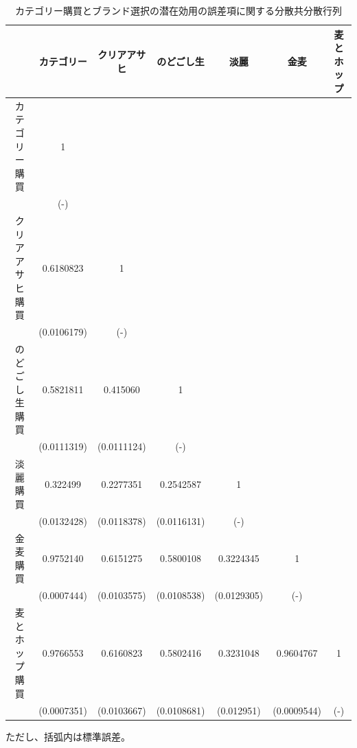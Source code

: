 \documentclass[11pt]{jsarticle}
\begin{document}
\begin{table}[htbp]
 \centering
  \caption{カテゴリー購買とブランド選択の潜在効用の誤差項に関する分散共分散行列}
\begin{center}
 \begin{tabular}{c|cccccc} \hline
   & カテゴリー & クリアアサヒ & のどごし生 & 淡麗 & 金麦 & 麦とホップ \\ \hline
カテゴリー購買 & 1 &  &  &  &  &  \\
   & (-) &  &  &  &  &  \\
クリアアサヒ購買 & 0.6180823 & 1 &  &  &  &  \\
 & (0.0106179) & (-) &  &  &  &  \\
のどごし生購買 & 0.5821811 & 0.415060 & 1 &  &  &  \\
 & (0.0111319) & (0.0111124) & (-) &  &  &  \\
淡麗購買 & 0.322499 & 0.2277351 & 0.2542587 & 1 &  &  \\
 & (0.0132428) & (0.0118378) & (0.0116131) & (-) &  &  \\
金麦購買 & 0.9752140 & 0.6151275 & 0.5800108 & 0.3224345 & 1 &  \\
 & (0.0007444) & (0.0103575) & (0.0108538) & (0.0129305) & (-) &  \\
麦とホップ購買 & 0.9766553 & 0.6160823 & 0.5802416 & 0.3231048 & 0.9604767 & 1 \\
 & (0.0007351) & (0.0103667) & (0.0108681) & (0.012951) & (0.0009544) & (-) \\
 \end{tabular}
 \label{tab:simultaneous_matrix}
 \end{center}
\end{table}
ただし、括弧内は標準誤差。
\end{document}

